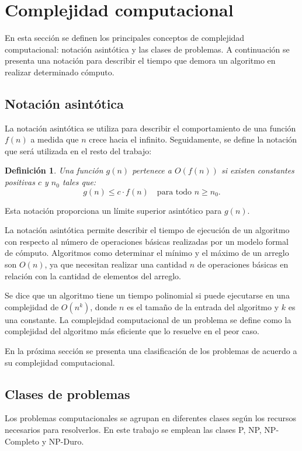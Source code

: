 \documentclass[12pt]{article}
\newtheorem{definition}{Definición}
\begin{document}
\section{Complejidad computacional}

En esta sección se definen los principales conceptos de complejidad computacional: notación asintótica y las clases de problemas. A continuación se presenta una notación para describir el tiempo que demora un algoritmo en realizar determinado cómputo.

\subsection{Notación asintótica}

La notación asintótica se utiliza para describir el comportamiento de una función $f(n)$ a medida que $n$ crece hacia el infinito.  Seguidamente, se define la notación que será utilizada en el resto del trabajo:

\begin{definition}
  Una función $g(n)$ pertenece a $O(f(n))$ si existen constantes positivas $c$ y $n_0$ tales que:
  \[
    g(n) \leq c \cdot f(n) \quad \text{para todo } n \geq n_0.
  \]
\end{definition}

Esta notación proporciona un límite superior asintótico para $g(n)$.

La notación asintótica permite describir el tiempo de ejecución de un algoritmo con respecto al número de 
operaciones básicas realizadas por un modelo formal de cómputo.  Algoritmos como determinar el mínimo y el 
máximo de un arreglo son $O(n)$, ya que necesitan realizar una cantidad $n$ de operaciones básicas en relación
con la cantidad de elementos del arreglo.

Se dice que un algoritmo tiene un tiempo polinomial si puede ejecutarse en una complejidad de $O(n^k)$, donde $n$ es el tamaño de la entrada del algoritmo y $k$
es una constante. La complejidad computacional de un problema se define como la complejidad del algoritmo más eficiente que lo resuelve en el peor caso.


En la próxima sección se presenta una clasificación de los problemas de acuerdo a su complejidad computacional.
\subsection{Clases de problemas}
\label{sec:problemsCategory}

Los problemas computacionales \cite{authomataTheory} se agrupan en diferentes clases según los recursos 
necesarios para resolverlos. En este trabajo se emplean las clases P, NP, NP-Completo y NP-Duro.
\end{document}
